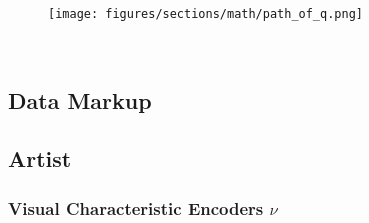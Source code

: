 \documentclass[../main.tex]{subfiles}
\begin{document}
\begin{figure}
\texttt{[image: figures/sections/math/path\_of\_q.png]}
\end{figure}

\
\subsection{Data Markup}

\subsection{Artist}

\subsubsection{Visual Characteristic Encoders $\nu$}

\subsubsection{}
\end{document}
